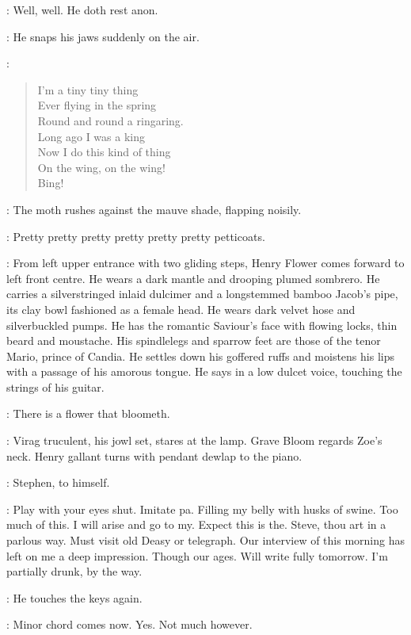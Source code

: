 \Virag:
Well, well.
He doth rest anon.

:
He snaps his jaws suddenly on the air.

\Moth[2]:
\begin{verse}
    I'm a tiny tiny thing\\
%
    Ever flying in the spring\\
    Round and round a ringaring.\\
    Long ago I was a king\\
    Now I do this kind of thing\\
    On the wing, on the wing!\\
    Bing!
\end{verse}

:
The moth rushes against the mauve shade, flapping noisily.

\Moth:
Pretty pretty pretty pretty pretty pretty petticoats.

:
From left upper entrance with two gliding steps,
Henry Flower comes forward to left front centre.
He wears a dark mantle and drooping plumed sombrero.
He carries a silverstringed inlaid dulcimer and
a longstemmed bamboo Jacob's pipe, its clay bowl fashioned as a female head.
He wears dark velvet hose and silverbuckled pumps.
He has the romantic Saviour's face with flowing locks, thin beard and moustache.
His spindlelegs and sparrow feet are those of the tenor Mario, prince of Candia.
He settles down his goffered ruffs
and moistens his lips with a passage of his amorous tongue.
He says in a low dulcet voice, touching the strings of his guitar.

\Henry:
There is a flower that bloometh.%

:
Virag truculent, his jowl set, stares at the lamp.
Grave Bloom regards Zoe's neck.
Henry gallant turns with pendant dewlap to the piano.

:
Stephen, to himself.

\Stephen:
Play with your eyes shut.
Imitate pa.
Filling my belly with husks of swine.
Too much of this.
I will arise and go to my.
Expect this is the.
Steve, thou art in a parlous way.
Must visit old Deasy or telegraph.
Our interview of this morning has left on me a deep impression.
Though our ages.
Will write fully tomorrow.
I'm partially drunk, by the way.

:
He touches the keys again.

\Stephen:
Minor chord comes now.
Yes. Not much however.

